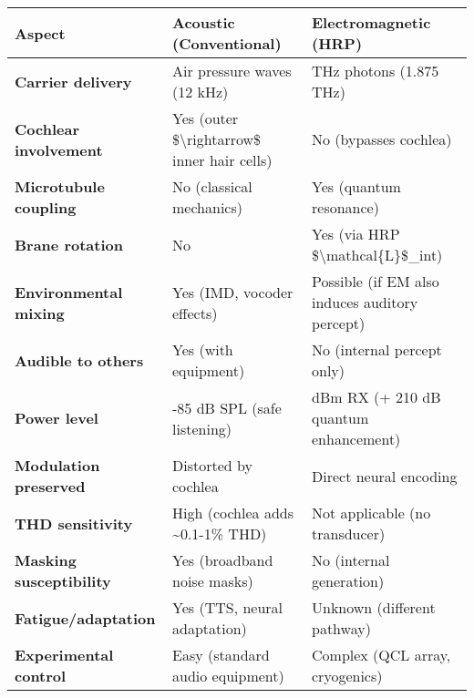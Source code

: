 {\def\LTcaptype{} %
\begin{longtable}[]{@{}
  >{\raggedright\arraybackslash}p{}
  >{\raggedright\arraybackslash}p{}
  >{\raggedright\arraybackslash}p{}@{}}
\toprule\noalign{}
\begin{minipage}[b]{\linewidth}\raggedright
Aspect
\end{minipage} & \begin{minipage}[b]{\linewidth}\raggedright
\textbf{Acoustic (Conventional)}
\end{minipage} & \begin{minipage}[b]{\linewidth}\raggedright
\textbf{Electromagnetic (HRP)}
\end{minipage} \\
\midrule\noalign{}
\endhead
\bottomrule\noalign{}
\endlastfoot
\textbf{Carrier delivery} & Air pressure waves (12 kHz) & THz photons
(1.875 THz) \\
\textbf{Cochlear involvement} & Yes (outer \$\textbackslash rightarrow\$
inner hair cells) & No (bypasses cochlea) \\
\textbf{Microtubule coupling} & No (classical mechanics) & Yes (quantum
resonance) \\
\textbf{Brane rotation} & No & Yes (via HRP
\$\textbackslash mathcal\{L\}\$\_int) \\
\textbf{Environmental mixing} & Yes (IMD, vocoder effects) & Possible
(if EM also induces auditory percept) \\
\textbf{Audible to others} & Yes (with equipment) & No (internal percept
only) \\
\textbf{Power level} & 70-85 dB SPL (safe listening) & -368 dBm RX (+
210 dB quantum enhancement) \\
\textbf{Modulation preserved} & Distorted by cochlea & Direct neural
encoding \\
\textbf{THD sensitivity} & High (cochlea adds \textasciitilde0.1-1\%
THD) & Not applicable (no transducer) \\
\textbf{Masking susceptibility} & Yes (broadband noise masks) & No
(internal generation) \\
\textbf{Fatigue/adaptation} & Yes (TTS, neural adaptation) & Unknown
(different pathway) \\
\textbf{Experimental control} & Easy (standard audio equipment) &
Complex (QCL array, cryogenics) \\
\end{longtable}
}

